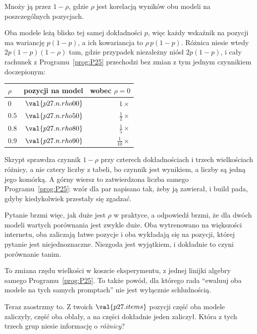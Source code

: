 \begin{fr}
\begin{ansblock}
Mnoży ją przez $1 - \rho$, gdzie $\rho$ jest korelacją wyników obu modeli na
poszczególnych pozycjach.
\end{ansblock}

Oba modele leżą blisko tej samej dokładności $p$, więc każdy wskaźnik na
pozycji ma wariancję $p(1-p)$, a ich kowariancja to $\rho\,p(1-p)$. Różnica
niesie wtedy $2p(1-p)(1-\rho)$ tam, gdzie przypadek niezależny niósł
$2p(1-p)$, i cały rachunek z Programu~\ref{prog:P25} przechodzi bez zmian z
tym jednym czynnikiem doczepionym:

\begin{center}
\begin{tabular}{lrr}
\toprule
$\rho$ & pozycji na model & wobec $\rho = 0$ \\
\midrule
$0$ & $\val{p27.n.rho00}$ & $1\times$ \\
$\num{0.5}$ & $\val{p27.n.rho50}$ & $\tfrac{1}{2}\times$ \\
$\num{0.8}$ & $\val{p27.n.rho80}$ & $\tfrac{1}{5}\times$ \\
$\num{0.9}$ & $\val{p27.n.rho90}$ & $\tfrac{1}{10}\times$ \\
\bottomrule
\end{tabular}
\end{center}

Skrypt sprawdza czynnik $1-\rho$ przy czterech dokładnościach i trzech
wielkościach różnicy, a nie cztery liczby z tabeli, bo czynnik jest wynikiem,
a liczby są jedną jego komórką. A górny wiersz to zatwierdzona liczba samego
Programu~\ref{prog:P25}: wzór dla par napisano tak, żeby ją zawierał, i build
pada, gdyby kiedykolwiek przestały się zgadzać.
\end{fr}

\begin{fr}
Pytanie brzmi więc, jak duże jest $\rho$ w praktyce, a odpowiedź brzmi, że dla
dwóch modeli wartych porównania jest zwykle duże. Oba wytrenowano na
większości internetu, oba zaliczają łatwe pozycje i oba wykładają się na
pozycji, której pytanie jest niejednoznaczne. Niezgoda jest wyjątkiem, i
dokładnie to czyni porównanie tanim.


To zmiana rzędu wielkości w koszcie eksperymentu, z jednej linijki algebry
samego Programu~\ref{prog:P25}. To także powód, dla którego rada
\enquote{ewaluuj oba modele na tych samych promptach} nie jest wyłącznie
schludnością.

Teraz zaostrzmy to. Z twoich $\val{p27.items}$ pozycji część oba modele
zaliczyły, część oba oblały, a na części dokładnie jeden zaliczył. Która z
tych trzech grup niesie informację o \emph{różnicy}?
\dotline
\nextframe
\end{fr}

